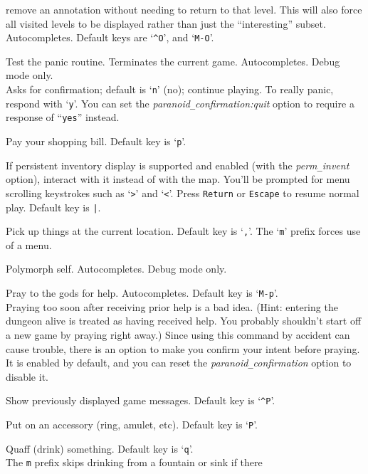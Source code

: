 remove an annotation without needing to return to that level.
This will also force all visited levels to be displayed rather than just
the ``interesting'' subset.
\\
Autocompletes.
Default keys are `{\tt \^{}O}', and `{\tt M-O}'.
\item[\tb{\#panic}]
Test the panic routine.
Terminates the current game.
Autocompletes.
Debug mode only.\\
Asks for confirmation; default is `{\tt n}' (no); continue playing.
To really panic, respond with `{\tt y}'.
You can set the
{\it paranoid\verb+_+confirmation:quit\/}
option to require a response of ``{\tt yes}'' instead.
\item[\tb{\#pay}]
Pay your shopping bill. Default key is `{\tt p}'.
\item[\tb{\#perminv}]
If persistent inventory display is supported and enabled (with the
{\it perm\verb+_+invent\/} option), interact with it instead of with the map.
You'll be prompted for menu scrolling keystrokes such
as `{\tt \verb+>+}' and `{\tt \verb+<+}'.
Press {\tt Return} or {\tt Escape} to resume normal play.
Default key is {\tt \verb+|+}.
\item[\tb{\#pickup}]
Pick up things at the current location. Default key is `{\tt ,}'.
The `{\tt m}' prefix forces use of a menu.
\item[\tb{\#polyself}]
Polymorph self.
Autocompletes.
Debug mode only.
\item[\tb{\#pray}]
Pray to the gods for help. Autocompletes. Default key is `{\tt M-p}'.\\
Praying too soon after receiving prior help is a bad idea.
(Hint: entering the dungeon alive is treated as having received help.
You probably shouldn't start off a new game by praying right away.)
Since using this command by accident can cause trouble, there is an
option to make you confirm your intent before praying.  It is enabled
by default, and you can reset the
{\it paranoid\verb+_+confirmation\/}
option to disable it.
\item[\tb{\#prevmsg}]
Show previously displayed game messages. Default key is `{\tt \^{}P}'.
\item[\tb{\#puton}]
Put on an accessory (ring, amulet, etc). Default key is `{\tt P}'.
\item[\tb{\#quaff}]
Quaff (drink) something. Default key is `{\tt q}'.\\
The {\tt m} prefix skips drinking from a fountain or sink if there
